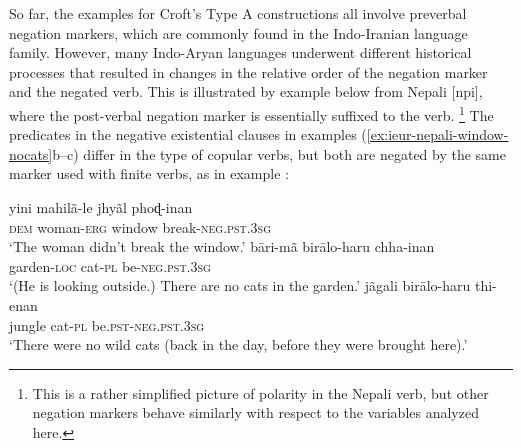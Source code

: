 \documentclass[output=paper,colorlinks,citecolor=brown]{langscibook}
\begin{document}
So far, the examples for Croft's Type A constructions all involve preverbal
negation markers, which are commonly found in the Indo-Iranian language family.
However, many Indo-Aryan languages underwent different historical processes
that resulted in changes in the relative order of the negation marker and
the negated verb. This is illustrated by example  below
from Nepali [npi], where the post-verbal negation marker is essentially
suffixed to the verb.%
%
\footnote{This is a rather simplified picture of
polarity in the Nepali verb, but other negation markers behave similarly
with respect to the variables analyzed here.} 
%
The predicates in the negative existential clauses in examples
(\ref{ex:ieur-nepali-window-nocats}b--c) differ in the type of
copular verbs, but both are negated by the same marker used with finite
verbs, as in example : 
%
\begin{exe}\ex\label{ex:ieur-nepali-window-nocats}
\begin{xlist}
\ex\label{ex:ieur-nepali-window}
    \gll yini  mahilã-le jhyãl phoɖ-inan\\
  \textsc{dem} woman-\textsc{erg} window  break-\textsc{neg.pst.3sg} \\
    \glt `The woman didn't break the window.'
\ex
\gll bāri-mã       birālo-haru  chha-inan \\
garden-\textsc{loc} cat-\textsc{pl} be-\textsc{neg.pst.3sg}\\
\glt `(He is looking outside.) There are no cats in the garden.'
\ex
\gll jãgali  birālo-haru  thi-enan\\
jungle cat-\textsc{pl}
be.\textsc{pst}-\textsc{neg}.\textsc{pst}.\textsc{3sg}\\ 
\glt `There were no wild cats (back in the day, before they were brought
here).'
\end{xlist}\end{exe}
\end{document}
